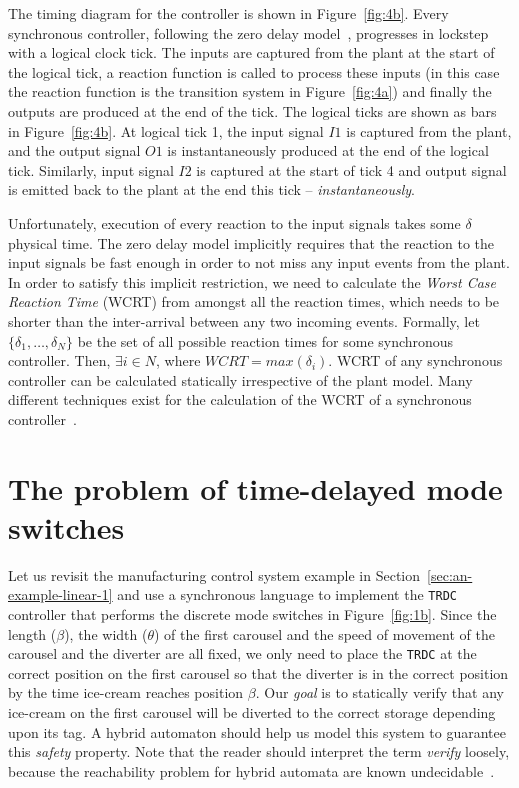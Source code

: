 \documentclass[10pt,journal,cspaper,compsoc]{IEEEtran}
\begin{document}
The timing diagram for the controller is shown in
Figure~\ref{fig:4b}. Every synchronous controller, following the zero
delay model~\cite{berry96}, progresses in lockstep with a logical clock
tick. The inputs are captured from the plant at the start of the logical
tick, a reaction function is called to process these inputs (in this
case the reaction function is the transition system in
Figure~\ref{fig:4a}) and finally the outputs are produced at the end of
the tick. The logical ticks are shown as bars in Figure~\ref{fig:4b}. At
logical tick 1, the input signal $I1$ is captured from the plant, and
the output signal $O1$ is instantaneously produced at the end of the
logical tick. Similarly, input signal $I2$ is captured at the start of
tick 4 and output signal is emitted back to the plant at the end this
tick -- \textit{instantaneously}.

Unfortunately, execution of every reaction to the input signals takes
some $\delta$ physical time. The zero delay model implicitly requires
that the reaction to the input signals be fast enough in order to not
miss any input events from the plant. In order to satisfy this implicit
restriction, we need to calculate the \textit{Worst Case Reaction Time}
(WCRT) from amongst all the reaction times, which needs to be shorter
than the inter-arrival between any two incoming events. Formally, let
$\{\delta_1,\ldots,\delta_N\}$ be the set of all possible reaction times
for some synchronous controller. Then, $\exists i \in N$, where
\mbox{$WCRT = max (\delta_i)$}. WCRT of any synchronous controller can
be calculated statically irrespective of the plant model. Many different
techniques exist for the calculation of the WCRT of a synchronous
controller~\cite{wilhelm08}.



\section{The problem of time-delayed mode switches}
\label{sec:motivating-example}





Let us revisit the manufacturing control system example in
Section~\ref{sec:an-example-linear-1} and use a synchronous language to
implement the \texttt{TRDC} controller that performs the discrete mode
switches in Figure~\ref{fig:1b}. Since the length ($\beta$), the width
($\theta$) of the first carousel and the speed of movement of the
carousel and the diverter are all fixed, we only need to place the
\texttt{TRDC} at the correct position on the first carousel so that the
diverter is in the correct position by the time ice-cream reaches
position $\beta$. Our \textit{goal} is to statically verify that any
ice-cream on the first carousel will be diverted to the correct storage
depending upon its tag. A hybrid automaton should help us model this
system to guarantee this \textit{safety} property. Note that the reader
should interpret the term \textit{verify} loosely, because the
reachability problem for hybrid automata are known
undecidable~\cite{alur1993hybrid}.
\end{document}
